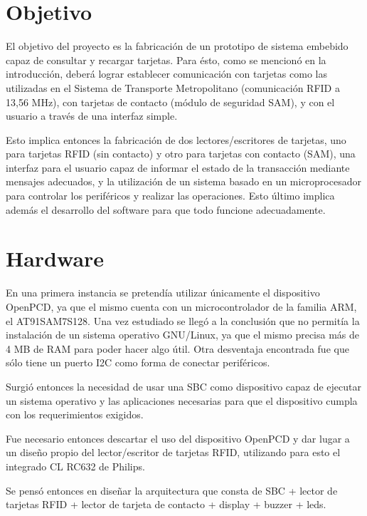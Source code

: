 \documentclass[%
        final,
        notitlepage,
        narroweqnarray,
        inline,
        ]{ieee}
\begin{document}
\section{Objetivo}
El objetivo del proyecto es la fabricación de un prototipo de sistema embebido capaz de consultar y recargar tarjetas. Para ésto, como se mencionó en la introducción, deberá lograr establecer comunicación con tarjetas  como las utilizadas en el Sistema de Transporte Metropolitano (comunicación RFID a 13,56 MHz), con tarjetas de contacto (módulo de seguridad SAM), y con el usuario a través de una interfaz simple.


Esto implica entonces la fabricación de dos lectores/escritores de tarjetas, uno para tarjetas RFID (sin contacto) y
otro para tarjetas con contacto (SAM), una interfaz para el usuario capaz de informar el estado de la transacción
mediante mensajes adecuados, y la utilización de un sistema basado en un microprocesador para controlar los periféricos
y realizar las operaciones. Esto último implica además el desarrollo del software para que todo funcione adecuadamente.



\section{Hardware}
En una primera instancia se pretendía utilizar únicamente el dispositivo OpenPCD, ya que el mismo cuenta con un microcontrolador de la familia ARM, el AT91SAM7S128. Una vez estudiado se llegó a la conclusión que no permitía la instalación de un sistema operativo GNU/Linux, ya que el mismo precisa más de 4 MB de RAM para poder hacer algo útil. Otra desventaja encontrada fue que sólo tiene un puerto I2C como forma de conectar periféricos.

Surgió entonces la necesidad de usar una SBC como dispositivo capaz de ejecutar un sistema operativo y las aplicaciones necesarias para que el dispositivo cumpla con los requerimientos exigidos.

Fue necesario entonces descartar el uso del dispositivo OpenPCD y dar lugar a un diseño propio del lector/escritor de tarjetas RFID, utilizando para esto el integrado CL RC632 de Philips.

Se pensó entonces en diseñar la arquitectura que consta de SBC + lector de tarjetas RFID + lector de tarjeta de contacto + display + buzzer + leds.
\end{document}

